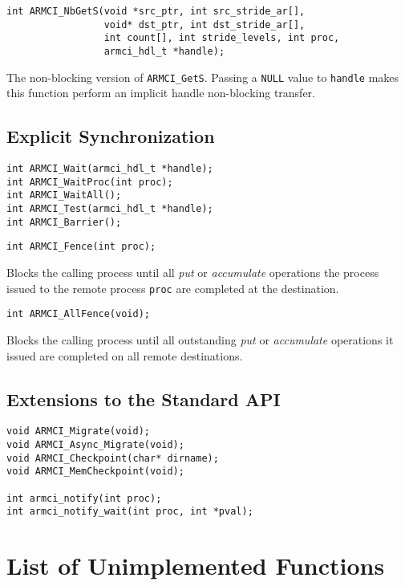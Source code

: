\documentclass[10pt]{article}
\begin{document}
\begin{verbatim}
int ARMCI_NbGetS(void *src_ptr, int src_stride_ar[],
                 void* dst_ptr, int dst_stride_ar[],
                 int count[], int stride_levels, int proc,
                 armci_hdl_t *handle);
\end{verbatim}
The non-blocking version of {\tt ARMCI\_GetS}. Passing a {\tt NULL}
value to {\tt handle} makes this function perform an implicit handle
non-blocking transfer.

\subsection{Explicit Synchronization}

\begin{verbatim}
int ARMCI_Wait(armci_hdl_t *handle);
int ARMCI_WaitProc(int proc);
int ARMCI_WaitAll();
int ARMCI_Test(armci_hdl_t *handle);
int ARMCI_Barrier();
\end{verbatim}

\begin{verbatim}
int ARMCI_Fence(int proc);
\end{verbatim}
Blocks the calling process until all {\em put} or {\em accumulate}
operations the process issued to the remote process {\tt proc} are
completed at the destination.

\begin{verbatim}
int ARMCI_AllFence(void);
\end{verbatim}
Blocks the calling process until all outstanding {\em put} or {\em
accumulate} operations it issued are completed on all remote
destinations.

\subsection{Extensions to the Standard API}
\label{sec::extensions}

\begin{verbatim}
void ARMCI_Migrate(void);
void ARMCI_Async_Migrate(void);
void ARMCI_Checkpoint(char* dirname);
void ARMCI_MemCheckpoint(void);

int armci_notify(int proc);
int armci_notify_wait(int proc, int *pval);
\end{verbatim}

\section{List of Unimplemented Functions}
\end{document}
